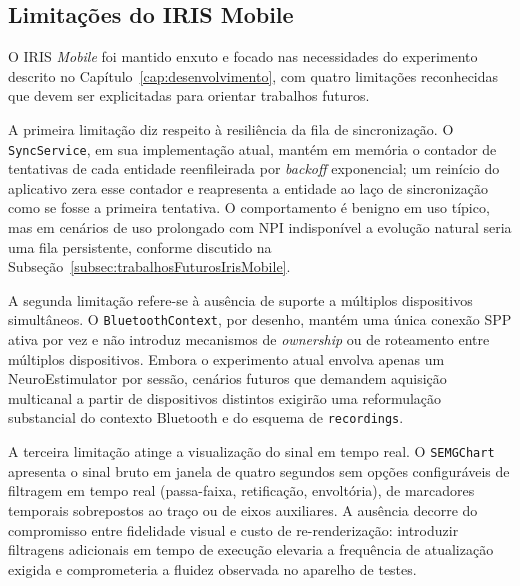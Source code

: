\subsection{Limitações do IRIS Mobile}\label{subsec:limitacoesIRISMobile}


O IRIS \textit{Mobile} foi mantido enxuto e focado nas necessidades do experimento descrito no Capítulo~\ref{cap:desenvolvimento}, com quatro limitações reconhecidas que devem ser explicitadas para orientar trabalhos futuros.

A primeira limitação diz respeito à resiliência da fila de sincronização. O \texttt{SyncService}, em sua implementação atual,
mantém em memória o contador de tentativas de cada entidade reenfileirada por \textit{backoff} exponencial; um reinício do aplicativo zera esse contador e reapresenta a entidade ao laço de sincronização como se fosse a primeira tentativa. O comportamento é benigno em uso típico, mas em cenários de uso prolongado com NPI indisponível a evolução natural seria uma fila persistente, conforme discutido na Subseção~\ref{subsec:trabalhosFuturosIrisMobile}.

A segunda limitação refere-se à ausência de suporte a múltiplos dispositivos simultâneos. O \texttt{BluetoothContext}, por desenho, mantém uma única conexão SPP ativa por vez e não introduz mecanismos de \textit{ownership} ou de roteamento entre múltiplos dispositivos. Embora o experimento atual envolva apenas um NeuroEstimulator por sessão, cenários futuros que demandem aquisição  multicanal a partir de dispositivos distintos exigirão uma reformulação substancial do contexto Bluetooth e do esquema de \texttt{recordings}.

A terceira limitação atinge a visualização do sinal em tempo real. O \texttt{SEMGChart} apresenta o sinal bruto em janela de quatro segundos sem opções configuráveis de filtragem em tempo real (passa-faixa, retificação, envoltória), de marcadores temporais sobrepostos ao traço ou de eixos auxiliares. A ausência decorre do compromisso entre fidelidade visual e custo de re-renderização: introduzir filtragens adicionais em tempo de execução elevaria a frequência de atualização exigida e comprometeria a fluidez observada no aparelho de testes.

